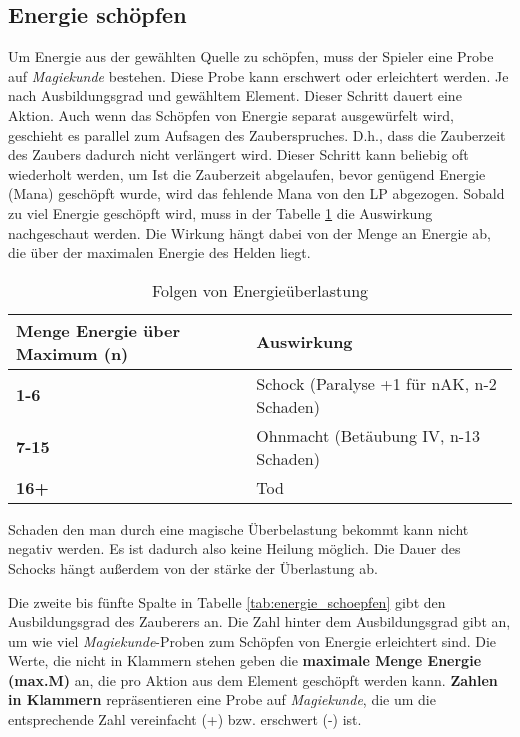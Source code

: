 \subsection{Energie schöpfen}
\label{chap:energie_schoepfen}
Um Energie aus der gewählten Quelle zu schöpfen, muss der Spieler eine Probe auf \textit{Magiekunde} bestehen. Diese Probe kann erschwert oder erleichtert werden. Je nach Ausbildungsgrad und gewähltem Element. Dieser Schritt dauert eine Aktion. Auch wenn das Schöpfen von Energie separat ausgewürfelt wird, geschieht es parallel zum Aufsagen des Zauberspruches. D.h., dass die Zauberzeit des Zaubers dadurch nicht verlängert wird. Dieser Schritt kann beliebig oft wiederholt werden, um  Ist die Zauberzeit abgelaufen, bevor genügend Energie (Mana) geschöpft wurde, wird das fehlende Mana von den LP abgezogen. Sobald zu viel Energie geschöpft wird, muss in der Tabelle \ref{tab:energieueberlastung} die Auswirkung nachgeschaut werden. Die Wirkung hängt dabei von der Menge an Energie ab, die über der maximalen Energie des Helden liegt.

\begin{table}[H]
\begin{center}
\begin{tabular}{|l|l|}
\hline
\textbf{Menge Energie über Maximum (n)} & \textbf{Auswirkung} \\ \hline
\textbf{1-6} & Schock (Paralyse +1 für nAK, n-2 Schaden) \\ \hline
\textbf{7-15} & Ohnmacht (Betäubung IV, n-13 Schaden) \\ \hline
\textbf{16+} & Tod \\ \hline

\end{tabular}
\end{center}
\caption{Folgen von Energieüberlastung}
\label{tab:energieueberlastung}
\end{table}

Schaden den man durch eine magische Überbelastung bekommt kann nicht negativ werden. Es ist dadurch also keine Heilung möglich. Die Dauer des Schocks hängt außerdem von der stärke der Überlastung ab.

Die zweite bis fünfte Spalte in Tabelle \ref{tab:energie_schoepfen} gibt den Ausbildungsgrad des Zauberers an. Die Zahl hinter dem Ausbildungsgrad gibt an, um wie viel \textit{Magiekunde}-Proben zum Schöpfen von Energie erleichtert sind. Die Werte, die nicht in Klammern stehen geben die \textbf{maximale Menge Energie (max.M)} an, die pro Aktion aus dem Element geschöpft werden kann. \textbf{Zahlen in Klammern} repräsentieren eine Probe auf \textit{Magiekunde}, die um die entsprechende Zahl vereinfacht (+) bzw. erschwert (-) ist. 

